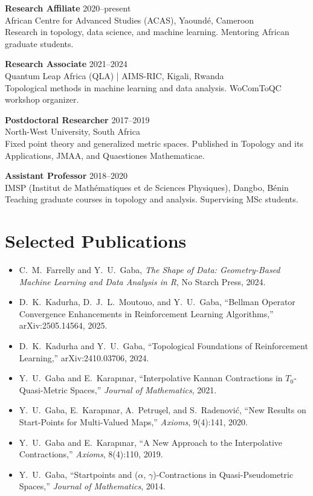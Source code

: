 \documentclass[11pt,a4paper]{article}
\begin{document}
\medskip

\textbf{Research Affiliate} \hfill 2020--present\\
African Centre for Advanced Studies (ACAS), Yaound\'e, Cameroon\\
{\small Research in topology, data science, and machine learning. Mentoring African graduate students.}

\medskip

\textbf{Research Associate} \hfill 2021--2024\\
Quantum Leap Africa (QLA) | AIMS-RIC, Kigali, Rwanda\\
{\small Topological methods in machine learning and data analysis. WoComToQC workshop organizer.}

\medskip

\textbf{Postdoctoral Researcher} \hfill 2017--2019\\
North-West University, South Africa\\
{\small Fixed point theory and generalized metric spaces. Published in Topology and its Applications, JMAA, and Quaestiones Mathematicae.}

\medskip

\textbf{Assistant Professor} \hfill 2018--2020\\
IMSP (Institut de Math\'ematiques et de Sciences Physiques), Dangbo, B\'enin\\
{\small Teaching graduate courses in topology and analysis. Supervising MSc students.}

\section{Selected Publications}

\begin{itemize}[leftmargin=1.5em,itemsep=2pt]
\item C.~M.~Farrelly and Y.~U.~Gaba, \emph{The Shape of Data: Geometry-Based Machine Learning and Data Analysis in R}, No Starch Press, 2024.
\item D.~K.~Kadurha, D.~J.~L.~Moutouo, and Y.~U.~Gaba, ``Bellman Operator Convergence Enhancements in Reinforcement Learning Algorithms,'' arXiv:2505.14564, 2025.
\item D.~K.~Kadurha and Y.~U.~Gaba, ``Topological Foundations of Reinforcement Learning,'' arXiv:2410.03706, 2024.
\item Y.~U.~Gaba and E.~Karap\i nar, ``Interpolative Kannan Contractions in $T_0$-Quasi-Metric Spaces,'' \emph{Journal of Mathematics}, 2021.
\item Y.~U.~Gaba, E.~Karap\i nar, A.~Petru\c{s}el, and S.~Radenovi\'c, ``New Results on Start-Points for Multi-Valued Maps,'' \emph{Axioms}, 9(4):141, 2020.
\item Y.~U.~Gaba and E.~Karap\i nar, ``A New Approach to the Interpolative Contractions,'' \emph{Axioms}, 8(4):110, 2019.
\item Y.~U.~Gaba, ``Startpoints and ($\alpha$, $\gamma$)-Contractions in Quasi-Pseudometric Spaces,'' \emph{Journal of Mathematics}, 2014.
\end{itemize}
\end{document}
